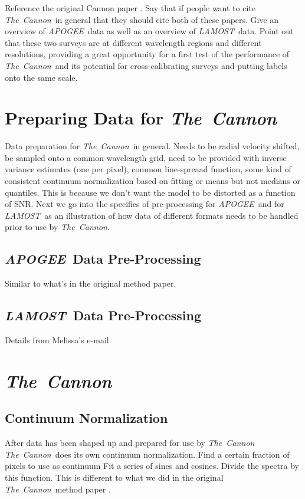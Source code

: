 \documentclass[12pt, preprint]{aastex}
\newcommand{\tc}{\textsl{The~Cannon}}
\newcommand{\apogee}{\textsl{APOGEE}}
\newcommand{\lamost}{\textsl{LAMOST}}
\begin{document}
Reference the original Cannon paper \citep{ness2015}. Say that if people want
to cite \tc\ in general that they should cite both of these papers. Give an 
overview of \apogee\ data as well as an overview of \lamost\ data. Point out
that these two surveys are at different wavelength regions and different 
resolutions, providing a great opportunity for a first test of the performance
of \tc\ and its potential for cross-calibrating surveys and putting labels
onto the same scale.

\section{Preparing Data for \tc}

Data preparation for \tc\ in general. Needs to be radial velocity shifted,
be sampled onto a common wavelength grid, need to be provided with inverse
variance estimates (one per pixel), common line-spreaad function, some kind of
consistent continuum normalization based on fitting or means but not medians
or quantiles. This is because we don't want the model to be distorted as a 
function of SNR. Next we go into the specifics of pre-processing for \apogee\
and for \lamost\ as an illustration of how data of different formats needs to 
be handled prior to use by \tc.

\subsection{\apogee\ Data Pre-Processing}

Similar to what's in the original method paper.

\subsection{\lamost\ Data Pre-Processing}

Details from Melissa's e-mail.

\section{\tc}

\subsection{Continuum Normalization}

After data has been shaped up and prepared for use by \tc\, \tc\ does its own
continuum normalization. Find a certain fraction of pixels to use as continuum
Fit a series of sines and cosines. Divide the spectra by this function. This 
is different to what we did in the original \tc\ method paper \citep{ness2015}. 
\end{document}
